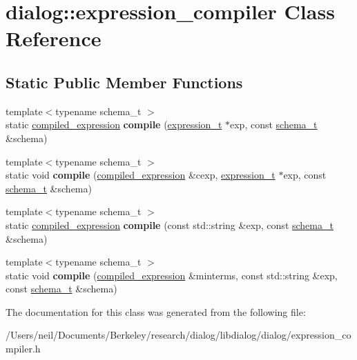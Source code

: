 \hypertarget{classdialog_1_1expression__compiler}{}\section{dialog\+:\+:expression\+\_\+compiler Class Reference}
\label{classdialog_1_1expression__compiler}
\subsection*{Static Public Member Functions}
\begin{DoxyCompactItemize}
\item 
\mbox{\label{classdialog_1_1expression__compiler_aa142fb4f61014a6e7403ee901bde646b}} 
{\footnotesize template$<$typename schema\+\_\+t $>$ }\\static \hyperlink{structdialog_1_1compiled__expression}{compiled\+\_\+expression} {\bfseries compile} (\hyperlink{structdialog_1_1expression__t}{expression\+\_\+t} $\ast$exp, const \hyperlink{classdialog_1_1schema__t}{schema\+\_\+t} \&schema)
\item 
\mbox{\label{classdialog_1_1expression__compiler_a333615d4926a13c06ae9a254a43b12cd}} 
{\footnotesize template$<$typename schema\+\_\+t $>$ }\\static void {\bfseries compile} (\hyperlink{structdialog_1_1compiled__expression}{compiled\+\_\+expression} \&cexp, \hyperlink{structdialog_1_1expression__t}{expression\+\_\+t} $\ast$exp, const \hyperlink{classdialog_1_1schema__t}{schema\+\_\+t} \&schema)
\item 
\mbox{\label{classdialog_1_1expression__compiler_a17ff2d529e43cec1be451f52a1f4ab60}} 
{\footnotesize template$<$typename schema\+\_\+t $>$ }\\static \hyperlink{structdialog_1_1compiled__expression}{compiled\+\_\+expression} {\bfseries compile} (const std\+::string \&exp, const \hyperlink{classdialog_1_1schema__t}{schema\+\_\+t} \&schema)
\item 
\mbox{\label{classdialog_1_1expression__compiler_ac0169a4a67653a455c4e0309aafedb1e}} 
{\footnotesize template$<$typename schema\+\_\+t $>$ }\\static void {\bfseries compile} (\hyperlink{structdialog_1_1compiled__expression}{compiled\+\_\+expression} \&minterms, const std\+::string \&exp, const \hyperlink{classdialog_1_1schema__t}{schema\+\_\+t} \&schema)
\end{DoxyCompactItemize}


The documentation for this class was generated from the following file\+:\begin{DoxyCompactItemize}
\item 
/\+Users/neil/\+Documents/\+Berkeley/research/dialog/libdialog/dialog/expression\+\_\+compiler.\+h\end{DoxyCompactItemize}
